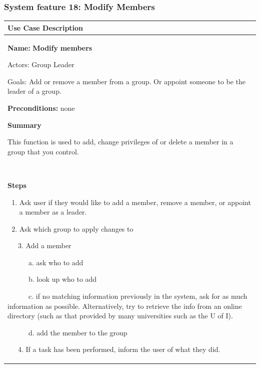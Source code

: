\documentclass[letterpaper]{article}
\newcommand\textstyleDefaultParagraphFont[1]{#1}
\newcommand\liststyleLx{%
\renewcommand\theenumi{\arabic{enumi}}
\renewcommand\theenumii{\alph{enumii}}
\renewcommand\theenumiii{\roman{enumiii}}
\renewcommand\theenumiv{\arabic{enumiv}}
\renewcommand\labelenumi{\theenumi.}
\renewcommand\labelenumii{\theenumii.}
\renewcommand\labelenumiii{\theenumiii.}
\renewcommand\labelenumiv{\theenumiv.}
}
\begin{document}
\bigskip


\bigskip

\subsubsection[System feature 18: Modify Members]{\rmfamily System
feature 18: Modify Members}
\begin{flushleft}
\tablehead{}
\begin{supertabular}{|m{6.42126in}|}
\hline
\bfseries\color{black} Use Case Description\\\hline
{\color{black} \textstyleDefaultParagraphFont{\textbf{Name:
}}\textstyleDefaultParagraphFont{\textsf{\textbf{Modify
}}}\textstyleDefaultParagraphFont{\textsf{\textbf{members}}}}

{\color{black} Actors: Group Leader}

{\color{black} Goals: Add or remove a member from a group. Or appoint
someone to be the leader of a group.}

{\color{black} \textstyleDefaultParagraphFont{\textbf{Preconditions:
}}none}

{\bfseries\color{black} Summary}

{\color{black} This function is used to add, change privileges of or
delete a member in a group that you control.}

~

{\bfseries\color{black} Steps}

\liststyleLx
\begin{enumerate}
\item \color{black} Ask user if they would like to add a member, remove
a member, or appoint a member as a leader.\item \color{black} Ask which
group to apply changes to\end{enumerate}
{\color{black} \ \ \ 3. Add a member}

{\color{black} \ \ \ \ \ \ a. ask who to add}

{\color{black} \ \ \ \ \ \ b. look up who to add}

{\color{black} \ \ \ \ \ \ c. if no matching information previously in
the system, ask for as much information as possible. Alternatively, try
to retrieve the info from an online directory (such as that provided by
many universities such as the U of I).}

{\color{black} \ \ \ \ \ \ d. add the member to the group}

{\color{black} \ \ \ 4. If a task has been performed, inform the user of
what they did.}


\end{supertabular}
\end{flushleft}
\end{document}
